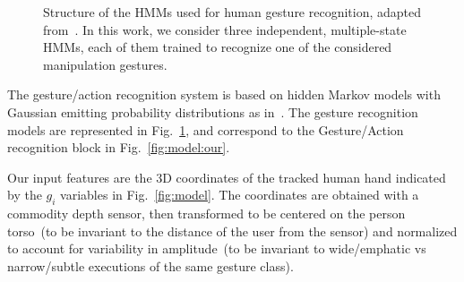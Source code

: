 \newcommand{\myscalefactor}{0.8}

\newcommand{\standardhmm}[1]{
    \node[draw,circle] (hmm#1s1) {$s_1$};
    \node[draw,circle, right of=hmm#1s1] (hmm#1s2) {$s_2$};
    \node[circle, right of=hmm#1s2] (hmm#1s3) {\dots};
    \node[draw,circle, right of=hmm#1s3] (hmm#1s4) {$s_Q$};
    \node[left of=hmm#1s1]  (invisible1) {};
    \node[right of=hmm#1s4] (invisible2) {};
    \path[->] (hmm#1s1) edge (hmm#1s2);
    \path[loop above] (hmm#1s1) edge (hmm#1s1);
    \path[->] (hmm#1s2) edge (hmm#1s3);
    \path[loop above] (hmm#1s2) edge (hmm#1s2);
    \path[dashed] (hmm#1s2) -- (hmm#1s3);
    \path[->] (hmm#1s3) edge (hmm#1s4);
    \path[loop above] (hmm#1s4) edge (hmm#1s4);
    \path[->] (invisible1) edge (hmm#1s1);
    \path[->] (hmm#1s4) edge (invisible2);
}

\newcommand{\modeltwo}{
}

\begin{figure}
  \centering
  \modeltwo
  \caption{Structure of the \acp{HMM} used for human gesture recognition, adapted from~\cite{saponaro:2013:crhri}. In this work, we consider three independent, multiple-state \acp{HMM}, each of them trained to recognize one of the considered manipulation gestures.}
  \label{fig:hmms}
\end{figure}

The gesture/action recognition system is based on hidden Markov models with Gaussian emitting probability distributions as in~\cite{saponaro:2013:crhri}.
The gesture recognition models are represented in Fig.~\ref{fig:hmms}, and correspond to the Gesture/Action recognition block in Fig.~\ref{fig:model:our}.

Our input features are the 3D coordinates of the tracked human hand indicated by the $g_i$ variables in Fig.~\ref{fig:model}.
The coordinates are obtained with a commodity depth sensor, then transformed to be centered on the person torso~(to be invariant to the distance of the user from the sensor) and normalized to account for variability in amplitude~(to be invariant to wide/emphatic vs narrow/subtle executions of the same gesture class).

